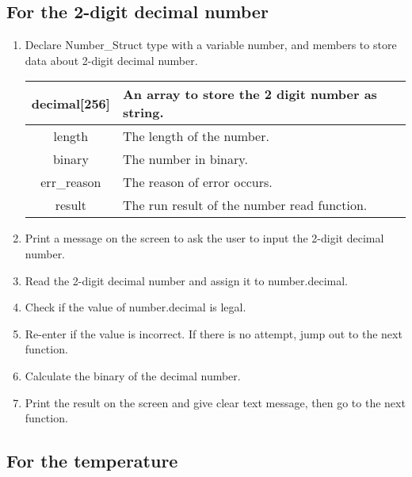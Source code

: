 \documentclass[12pt]{article}
\begin{document}
	\subsection{For the 2-digit decimal number}

	\begin{enumerate}
		\item Declare Number\_Struct type with a variable number, and members to store data about 2-digit decimal number.
		\begin{table}[H]
			\centering
			\begin{tabular}{|c|l|}
				\hline
				decimal{[}256{]} & An array to store the 2 digit number as string. \\ \hline
				length           & The length of the number.                       \\ \hline
				binary           & The number in binary.                           \\ \hline
				err\_reason      & The reason of error occurs.                     \\ \hline
				result           & The run result of the number read function.     \\ \hline
			\end{tabular}
		\end{table}
		\item Print a message on the screen to ask the user to input the 2-digit decimal number.
	
		\item Read the 2-digit decimal number and assign it to number.decimal.
	
		\item Check if the value of number.decimal is legal.
	
		\item Re-enter if the value is incorrect. If there is no attempt, jump out to the next function.
	
		\item Calculate the binary of the decimal number.
	
		\item Print the result on the screen and give clear text message, then go to the next function.
	\end{enumerate}
	
	\subsection{For the temperature}
\end{document}
